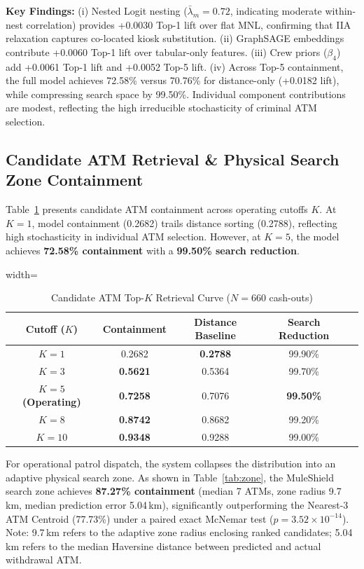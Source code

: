\documentclass[conference]{IEEEtran}
\begin{document}
\textbf{Key Findings:} (i) Nested Logit nesting ($\bar{\lambda}_m = 0.72$, indicating moderate within-nest correlation) provides +0.0030 Top-1 lift over flat MNL, confirming that IIA relaxation captures co-located kiosk substitution. (ii) GraphSAGE embeddings contribute +0.0060 Top-1 lift over tabular-only features. (iii) Crew priors ($\beta_4$) add +0.0061 Top-1 lift and +0.0052 Top-5 lift. (iv) Across Top-5 containment, the full model achieves 72.58\% versus 70.76\% for distance-only (+0.0182 lift), while compressing search space by 99.50\%. Individual component contributions are modest, reflecting the high irreducible stochasticity of criminal ATM selection.

\subsection{Candidate ATM Retrieval \& Physical Search Zone Containment}
Table~\ref{tab:topk} presents candidate ATM containment across operating cutoffs $K$. At $K=1$, model containment (0.2682) trails distance sorting (0.2788), reflecting high stochasticity in individual ATM selection. However, at $K=5$, the model achieves \textbf{72.58\% containment} with a \textbf{99.50\% search reduction}.

\begin{table}[htbp]
\caption{Candidate ATM Top-$K$ Retrieval Curve ($N=660$ cash-outs)}
\label{tab:topk}
\centering
\begin{adjustbox}{width=\columnwidth}
\begin{tabular}{ccccc}
\toprule
\textbf{Cutoff ($K$)} & \textbf{Containment} & \textbf{Distance Baseline} & \textbf{Search Reduction} \\
\midrule
$K = 1$ & 0.2682 & \textbf{0.2788} & 99.90\% \\
$K = 3$ & \textbf{0.5621} & 0.5364 & 99.70\% \\
\textbf{$K = 5$ (Operating)} & \textbf{0.7258} & 0.7076 & \textbf{99.50\%} \\
$K = 8$ & \textbf{0.8742} & 0.8682 & 99.20\% \\
$K = 10$ & \textbf{0.9348} & 0.9288 & 99.00\% \\
\bottomrule
\end{tabular}
\end{adjustbox}
\end{table}

For operational patrol dispatch, the system collapses the distribution into an adaptive physical search zone. As shown in Table~\ref{tab:zone}, the MuleShield search zone achieves \textbf{87.27\% containment} (median 7 ATMs, zone radius 9.7\,km, median prediction error 5.04\,km), significantly outperforming the Nearest-3 ATM Centroid (77.73\%) under a paired exact McNemar test ($p = 3.52 \times 10^{-14}$). Note: 9.7\,km refers to the adaptive zone radius enclosing ranked candidates; 5.04\,km refers to the median Haversine distance between predicted and actual withdrawal ATM.
\end{document}
